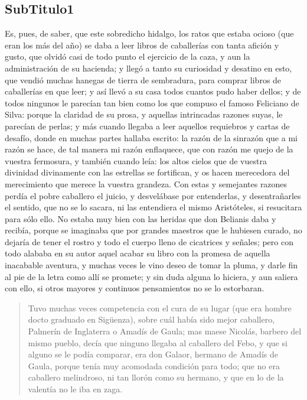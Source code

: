 \subsection{SubTitulo1}
Es, pues, de saber, que este sobredicho hidalgo, los ratos que estaba ocioso (que eran los más del año) se daba a leer libros de caballerías con tanta afición y gusto, que olvidó casi de todo punto el ejercicio de la caza, y aun la administración de su hacienda; y llegó a tanto su curiosidad y desatino en esto, que vendió muchas hanegas de tierra de sembradura, para comprar libros de caballerías en que leer; y así llevó a su casa todos cuantos pudo haber dellos; y de todos ningunos le parecían tan bien como los que compuso el famoso Feliciano de Silva: porque la claridad de su prosa, y aquellas intrincadas razones suyas, le parecían de perlas; y más cuando llegaba a leer aquellos requiebros y cartas de desafío, donde en muchas partes hallaba escrito: la razón de la sinrazón que a mi razón se hace, de tal manera mi razón enflaquece, que con razón me quejo de la vuestra fermosura, y también cuando leía: los altos cielos que de vuestra divinidad divinamente con las estrellas se fortifican, y os hacen merecedora del merecimiento que merece la vuestra grandeza. Con estas y semejantes razones perdía el pobre caballero el juicio, y desvelábase por entenderlas, y desentrañarles el sentido, que no se lo sacara, ni las entendiera el mismo Aristóteles, si resucitara para sólo ello. No estaba muy bien con las heridas que don Belianis daba y recibía, porque se imaginaba que por grandes maestros que le hubiesen curado, no dejaría de tener el rostro y todo el cuerpo lleno de cicatrices y señales; pero con todo alababa en su autor aquel acabar su libro con la promesa de aquella inacabable aventura, y muchas veces le vino deseo de tomar la pluma, y darle fin al pie de la letra como allí se promete; y sin duda alguna lo hiciera, y aun saliera con ello, si otros mayores y continuos pensamientos no se lo estorbaran.

\begin{quote}
Tuvo muchas veces competencia con el cura de su lugar (que era hombre docto graduado en Sigüenza), sobre cuál había sido mejor caballero, Palmerín de Inglaterra o Amadís de Gaula; mas maese Nicolás, barbero del mismo pueblo, decía que ninguno llegaba al caballero del Febo, y que si alguno se le podía comparar, era don Galaor, hermano de Amadís de Gaula, porque tenía muy acomodada condición para todo; que no era caballero melindroso, ni tan llorón como su hermano, y que en lo de la valentía no le iba en zaga.
\end{quote}

